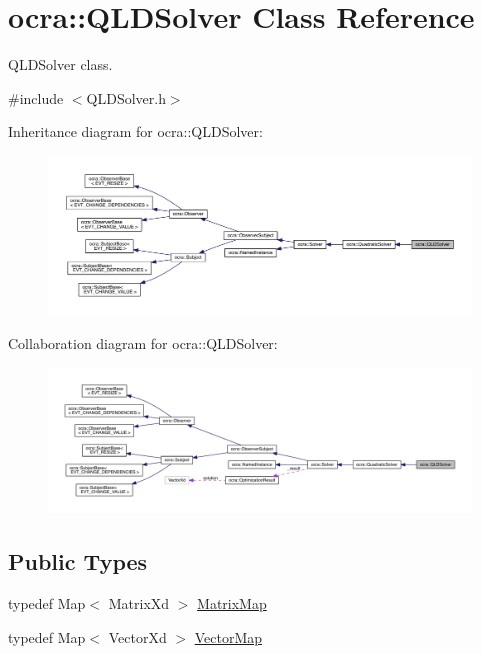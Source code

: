\hypertarget{classocra_1_1QLDSolver}{}\section{ocra\+:\+:Q\+L\+D\+Solver Class Reference}
\label{classocra_1_1QLDSolver}


Q\+L\+D\+Solver class.  




{\ttfamily \#include $<$Q\+L\+D\+Solver.\+h$>$}



Inheritance diagram for ocra\+:\+:Q\+L\+D\+Solver\+:\nopagebreak
\begin{figure}[H]
\begin{center}
\leavevmode
\includegraphics[width=350pt]{d8/dea/classocra_1_1QLDSolver__inherit__graph}
\end{center}
\end{figure}


Collaboration diagram for ocra\+:\+:Q\+L\+D\+Solver\+:\nopagebreak
\begin{figure}[H]
\begin{center}
\leavevmode
\includegraphics[width=350pt]{dd/d5f/classocra_1_1QLDSolver__coll__graph}
\end{center}
\end{figure}
\subsection*{Public Types}
\begin{DoxyCompactItemize}
\item 
typedef Map$<$ Matrix\+Xd $>$ \hyperlink{classocra_1_1QLDSolver_aebfc53b837336b9942a8ed2e6ca6c0e2}{Matrix\+Map}
\item 
typedef Map$<$ Vector\+Xd $>$ \hyperlink{classocra_1_1QLDSolver_a0f7e278b557ca2b7fad6d059ee87a707}{Vector\+Map}
\end{DoxyCompactItemize}
